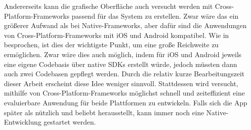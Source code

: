 		Andererseits kann die grafische Oberfläche auch versucht werden mit Cross-Platform-Frameworks passend für das System zu erstellen. Zwar wäre das ein größerer Aufwand als bei Native-Frameworks,
		aber dafür sind die Anwendungen von Cross-Platform-Frameworks mit iOS und Android kompatibel. Wie in  besprochen, ist dies der wichtigste Punkt, um eine große Reichweite zu ermöglichen. Zwar wäre dies auch möglich, indem für iOS und Android jeweils eine eigene Codebasis über native SDKs erstellt würde, jedoch müssten dann auch zwei Codebasen gepflegt werden. Durch die relativ kurze Bearbeitungszeit dieser Arbeit erscheint diese Idee weniger sinnvoll. Stattdessen wird versucht, mithilfe von Cross-Platform-Frameworks möglichst schnell und zeiteffizient eine evaluierbare Anwendung für beide Plattformen zu entwickeln. Falls sich die App später als nützlich und beliebt herausstellt, kann immer noch eine Native-Entwicklung gestartet werden.
	
